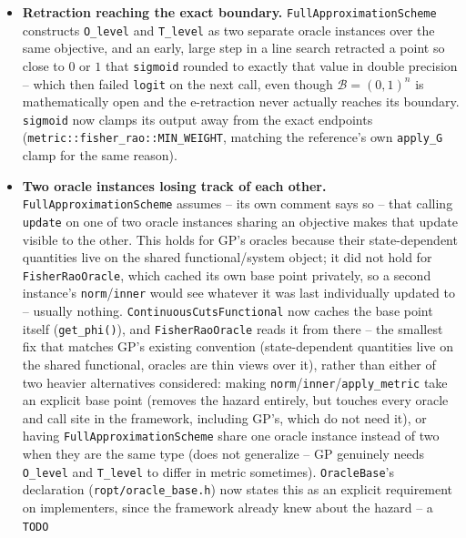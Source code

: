\documentclass[11pt]{article}
\newcommand{\B}{\mathcal{B}}
\begin{document}
\begin{itemize}[nosep]
  \item \textbf{Retraction reaching the exact boundary.} \texttt{FullApproximationScheme}
        constructs \texttt{O\_level} and \texttt{T\_level} as two separate oracle instances
        over the same objective, and an early, large step in a line search retracted a
        point so close to $0$ or $1$ that \texttt{sigmoid} rounded to exactly that value in
        double precision -- which then failed \texttt{logit} on the next call, even though
        $\B=(0,1)^n$ is mathematically open and the e-retraction never actually reaches its
        boundary. \texttt{sigmoid} now clamps its output away from the exact endpoints
        (\texttt{metric::fisher\_rao::MIN\_WEIGHT}, matching the reference's own
        \texttt{apply\_G} clamp for the same reason).
  \item \textbf{Two oracle instances losing track of each other.} \texttt{FullApproximationScheme}
        assumes -- its own comment says so -- that calling \texttt{update} on one of two
        oracle instances sharing an objective makes that update visible to the other. This
        holds for GP's oracles because their state-dependent quantities live on the shared
        functional/system object; it did not hold for \texttt{FisherRaoOracle}, which
        cached its own base point privately, so a second instance's \texttt{norm}/\texttt{inner}
        would see whatever it was last individually updated to -- usually nothing.
        \texttt{ContinuousCutsFunctional} now caches the base point itself
        (\texttt{get\_phi()}), and \texttt{FisherRaoOracle} reads it from there -- the
        smallest fix that matches GP's existing convention (state-dependent quantities live
        on the shared functional, oracles are thin views over it), rather than either of two
        heavier alternatives considered: making \texttt{norm}/\texttt{inner}/\texttt{apply\_metric}
        take an explicit base point (removes the hazard entirely, but touches every oracle
        and call site in the framework, including GP's, which do not need it), or having
        \texttt{FullApproximationScheme} share one oracle instance instead of two when they
        are the same type (does not generalize -- GP genuinely needs \texttt{O\_level} and
        \texttt{T\_level} to differ in metric sometimes). \texttt{OracleBase}'s declaration
        (\texttt{ropt/oracle\_base.h}) now states this as an explicit requirement on
        implementers, since the framework already knew about the hazard -- a \texttt{TODO}

\end{itemize}
\end{document}
